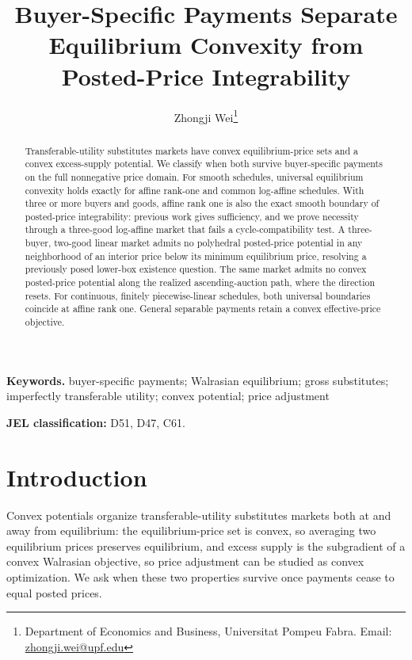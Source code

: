 \documentclass[11pt,a4paper,fleqn]{article}
\theoremstyle{plain}
\theoremstyle{definition}
\begin{document}
\title{\bfseries Buyer-Specific Payments Separate Equilibrium Convexity from Posted-Price Integrability}

\author{Zhongji Wei\thanks{Department of Economics and Business, Universitat Pompeu Fabra. Email: \href{mailto:zhongji.wei@upf.edu}{zhongji.wei@upf.edu}}}
\date{}
\maketitle

\begin{abstract}
Transferable-utility substitutes markets have convex equilibrium-price sets and a convex excess-supply potential. We classify when both survive buyer-specific payments on the full nonnegative price domain. For smooth schedules, universal equilibrium convexity holds exactly for affine rank-one and common log-affine schedules. With three or more buyers and goods, affine rank one is also the exact smooth boundary of posted-price integrability: previous work gives sufficiency, and we prove necessity through a three-good log-affine market that fails a cycle-compatibility test. A three-buyer, two-good linear market admits no polyhedral posted-price potential in any neighborhood of an interior price below its minimum equilibrium price, resolving a previously posed lower-box existence question. The same market admits no convex posted-price potential along the realized ascending-auction path, where the direction resets. For continuous, finitely piecewise-linear schedules, both universal boundaries coincide at affine rank one. General separable payments retain a convex effective-price objective.
\end{abstract}

\noindent\textbf{Keywords.} buyer-specific payments; Walrasian equilibrium; gross substitutes; imperfectly transferable utility; convex potential; price adjustment
\thispagestyle{plain}

\noindent\textbf{JEL classification:} D51, D47, C61.

\clearpage

\section{Introduction}\label{sec:introduction}

Convex potentials organize transferable-utility substitutes markets both at and away from equilibrium: the equilibrium-price set is convex, so averaging two equilibrium prices preserves equilibrium, and excess supply is the subgradient of a convex Walrasian objective, so price adjustment can be studied as convex optimization. We ask when these two properties survive once payments cease to equal posted prices.
\end{document}

